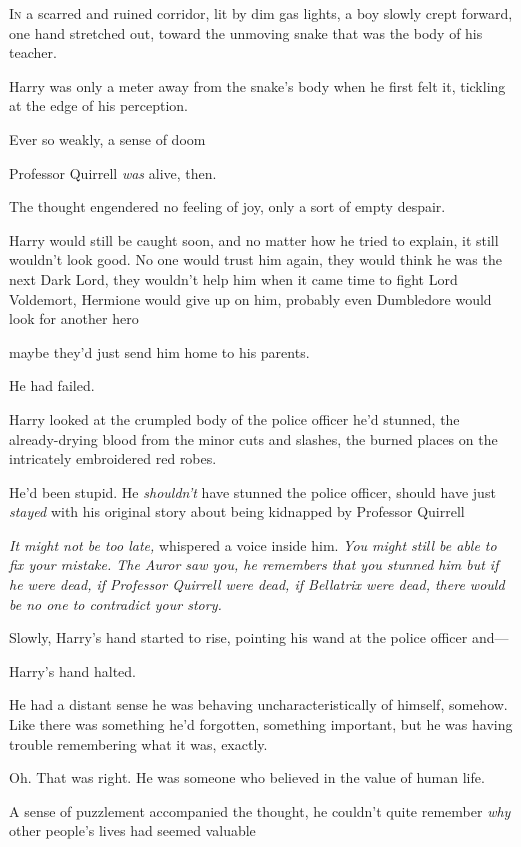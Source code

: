 
\lettrine{I}{n} a scarred and
ruined corridor, lit by dim gas lights, a boy slowly crept forward, one hand
stretched out, toward the unmoving snake that was the body of his teacher.

Harry was only a meter away from the snake's body when he first felt it,
tickling at the edge of his perception.

Ever so weakly, a sense of doom{\el}

Professor Quirrell \emph{was} alive, then.

The thought engendered no feeling of joy, only a sort of empty despair.

Harry would still be caught soon, and no matter how he tried to explain, it
still wouldn't look good. No one would trust him again, they would think he was
the next Dark Lord, they wouldn't help him when it came time to fight Lord
Voldemort, Hermione would give up on him, probably even Dumbledore would look
for another hero{\el}

{\el} maybe they'd just send him home to his parents.

He had failed.

Harry looked at the crumpled body of the police officer he'd stunned, the
already-drying blood from the minor cuts and slashes, the burned places on the
intricately embroidered red robes.

He'd been stupid. He \emph{shouldn't} have stunned the police officer, should
have just \emph{stayed} with his original story about being kidnapped by
Professor Quirrell{\el}

\emph{It might not be too late,} whispered a voice inside him. \emph{You might
still be able to fix your mistake. The Auror saw you, he remembers that you
stunned him{\el} but if he were dead, if Professor Quirrell were dead, if
Bellatrix were dead, there would be no one to contradict your story.}

Slowly, Harry's hand started to rise, pointing his wand at the police officer
and—

Harry's hand halted.

He had a distant sense he was behaving uncharacteristically of himself,
somehow. Like there was something he'd forgotten, something important, but he
was having trouble remembering what it was, exactly.

Oh. That was right. He was someone who believed in the value of human life.

A sense of puzzlement accompanied the thought, he couldn't quite remember
\emph{why} other people's lives had seemed valuable{\el}


